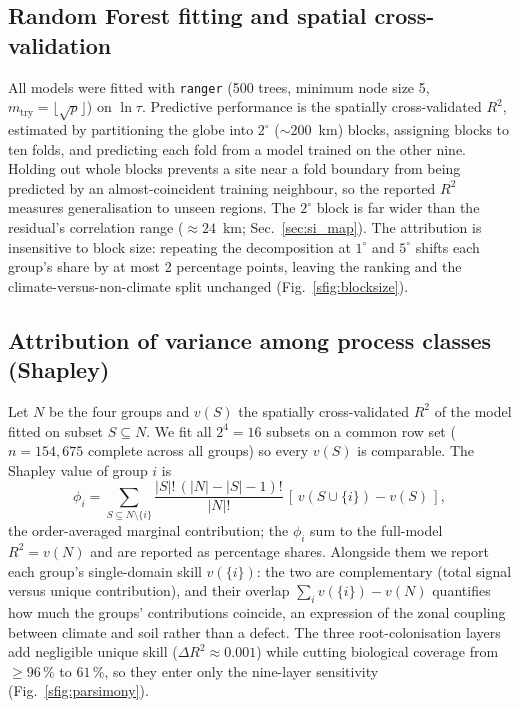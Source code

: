 \documentclass[12pt, a4paper]{article}
\begin{document}
\subsection{Random Forest fitting and spatial cross-validation}
All models were fitted with \texttt{ranger} \citep{Wright2017} (500 trees, minimum node
size 5, $m_\text{try}=\lfloor\sqrt{p}\rfloor$) on $\ln\tau$. Predictive performance is
the spatially cross-validated $R^2$, estimated by partitioning the globe into
$2^{\circ}$ ($\sim$200~km) blocks, assigning blocks to ten folds, and predicting each
fold from a model trained on the other nine. Holding out whole blocks prevents a site
near a fold boundary from being predicted by an almost-coincident training neighbour, so
the reported $R^2$ measures generalisation to unseen regions. The $2^{\circ}$ block is
far wider than the residual's correlation range ($\approx24$~km;
Sec.~\ref{sec:si_map}). The attribution is insensitive to block size: repeating the
decomposition at $1^{\circ}$ and $5^{\circ}$ shifts each group's share by at most
2 percentage points, leaving the ranking and the climate-versus-non-climate split
unchanged (Fig.~\ref{sfig:blocksize}).

\subsection{Attribution of variance among process classes (Shapley)}
\label{sec:si_shapley}
Let $N$ be the four groups and $v(S)$ the spatially cross-validated $R^2$ of the model
fitted on subset $S\subseteq N$. We fit all $2^4=16$ subsets on a common row set
($n=154{,}675$ complete across all groups) so every $v(S)$ is comparable. The Shapley
value of group $i$ is
\begin{equation}
  \phi_i = \!\!\sum_{S\subseteq N\setminus\{i\}}
  \frac{|S|!\,(|N|-|S|-1)!}{|N|!}\,[\,v(S\cup\{i\})-v(S)\,],
  \label{eq:shapley_si}
\end{equation}
the order-averaged marginal contribution; the $\phi_i$ sum to the full-model
$R^2=v(N)$ and are reported as percentage shares. Alongside them we report each group's
single-domain skill $v(\{i\})$: the two are complementary (total signal versus unique
contribution), and their overlap $\sum_i v(\{i\})-v(N)$ quantifies how much the groups'
contributions coincide, an expression of the zonal coupling between climate and soil
rather than a defect. The three root-colonisation layers add negligible unique skill
($\Delta R^2\approx0.001$) while cutting biological coverage from $\geq96\,\%$ to
$61\,\%$, so they enter only the nine-layer sensitivity (Fig.~\ref{sfig:parsimony}).
\end{document}
